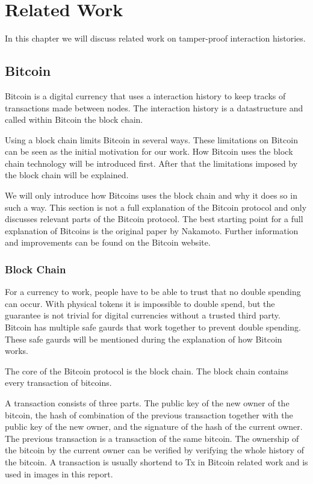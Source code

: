 \chapter{Related Work}
In this chapter we will discuss related work on tamper-proof interaction histories.

\section{Bitcoin}
Bitcoin is a digital currency that uses a interaction history 
to keep tracks of transactions made between nodes.
The interaction history is a datastructure and called within Bitcoin the block chain.

Using a block chain limits Bitcoin in several ways.
These limitations on Bitcoin can be seen as the initial motivation for our work.
How Bitcoin uses the block chain technology will be introduced first.
After that the limitations imposed by the block chain will be explained.

We will only introduce how Bitcoins uses the block chain and why it does so in such a way.
This section is not a full explanation of the Bitcoin protocol
and only discusses relevant parts of the Bitcoin protocol.
The best starting point for a full explanation of Bitcoins 
is the original paper by Nakamoto\cite{Nakamoto-bitcoin}.
Further information and improvements can be found on the Bitcoin website\cite{Bitcoin.org-site}.

\subsection{Block Chain}
For a currency to work, people have to be able to trust that no double spending can occur.
With physical tokens it is impossible to double spend,
but the guarantee is not trivial for digital currencies without a trusted third party.
Bitcoin has multiple safe gaurds that work together to prevent double spending.
These safe gaurds will be mentioned during the explanation of how Bitcoin works.

The core of the Bitcoin protocol is the block chain.
The block chain contains every transaction of bitcoins.

A transaction consists of three parts.
The public key of the new owner of the bitcoin,
the hash of combination of the previous transaction together with the public key of the new owner,
and the signature of the hash of the current owner.
The previous transaction is a transaction of the same bitcoin.
The ownership of the bitcoin by the current owner can be verified
by verifying the whole history of the bitcoin.
A transaction is usually shortend to Tx in Bitcoin related work and is used in images in this report.

